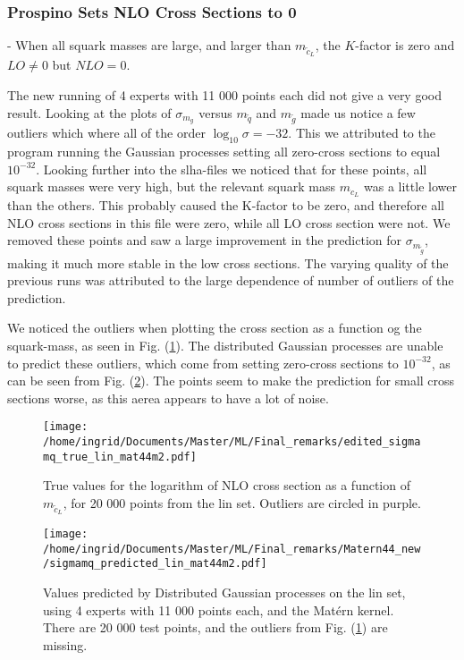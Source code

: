 \documentclass[twoside,english]{uiofysmaster}
\begin{document}
\subsubsection{Prospino Sets NLO Cross Sections to 0}

- When all squark masses are large, and larger than $m_{\tilde{c}_L}$, the $K$-factor is zero and $LO \neq 0$ but $NLO = 0$.

The new running of 4 experts with 11 000 points each did not give a very good result. Looking at the plots of $\sigma_{m_{g}}$ versus $m_{\tilde{q}}$ and $m_{\tilde{g}}$ made us notice a few outliers which where all of the order $\log_{10} \sigma = -32$. This we attributed to the program running the Gaussian processes setting all zero-cross sections to equal $10^{-32}$. Looking further into the slha-files we noticed that for these points, all squark masses were very high, but the relevant squark mass $m_{c_L}$ was a little lower than the others. This probably caused the K-factor to be zero, and therefore all NLO cross sections in this file were zero, while all LO cross section were not. We removed these points and saw a large improvement in the prediction for $\sigma_{m_{\tilde{g}}}$, making it much more stable in the low cross sections. The varying quality of the previous runs was attributed to the large dependence of number of outliers of the prediction.

We noticed the outliers when plotting the cross section as a function og the squark-mass, as seen in Fig. (\ref{Fig:: sigma mq true with outliers}). The distributed Gaussian processes are unable to predict these outliers, which come from setting zero-cross sections to $10^{-32}$, as can be seen from Fig. (\ref{Fig:: sigma mq predicted mat44m2_new}). The points seem to make the prediction for small cross sections worse, as this aerea appears to have a lot of noise. 

\begin{figure}
\centering
\texttt{[image: /home/ingrid/Documents/Master/ML/Final\_remarks/edited\_sigmamq\_true\_lin\_mat44m2.pdf]}
\caption{True values for the logarithm of NLO cross section as a function of $m_{\tilde{c}_L}$, for 20 000 points from the lin set. Outliers are circled in purple.}
\label{Fig:: sigma mq true with outliers}
\end{figure}

\begin{figure}
\centering
\texttt{[image: /home/ingrid/Documents/Master/ML/Final\_remarks/Matern44\_new/sigmamq\_predicted\_lin\_mat44m2.pdf]}
\caption{Values predicted by Distributed Gaussian processes on the lin set, using 4 experts with 11 000 points each, and the Mat\'{e}rn kernel. There are 20 000 test points, and the outliers from Fig. (\ref{Fig:: sigma mq true with outliers}) are missing.}
\label{Fig:: sigma mq predicted mat44m2_new}
\end{figure}
\end{document}
